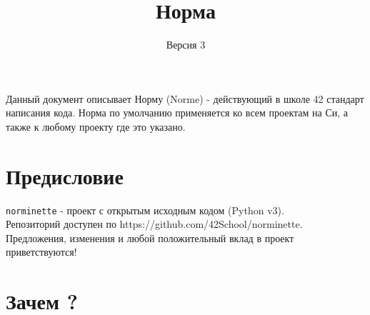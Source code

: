 \documentclass{42-ru}
\begin{document}
\title{Норма}
\subtitle{Версия 3}

\summary
{
    Данный документ описывает Норму (Norme) - действующий в школе 42 стандарт написания кода.
    Норма по умолчанию применяется ко всем проектам на Си, а также к любому проекту где это указано.
}

\maketitle

\tableofcontents


\chapter{Предисловие}

    \texttt{norminette} - проект с открытым исходным кодом (Python v3). \\
    Репозиторий доступен по https://github.com/42School/norminette. \\
    Предложения, изменения и любой положительный вклад в проект приветствуются!

    \newpage


\chapter{Зачем ?}
\end{document}
